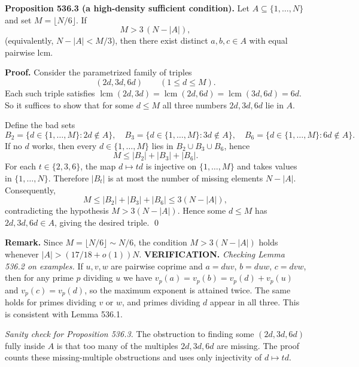 \medskip
\textbf{Proposition 536.3 (a high-density sufficient condition).}
Let $A\subseteq\{1,\dots,N\}$ and set $M=\lfloor N/6\rfloor$.
If
\[
M>3\,(N-|A|),
\]
(equivalently, $N-|A|<M/3$), then there exist distinct $a,b,c\in A$ with equal pairwise lcm.

\textbf{Proof.}
Consider the parametrized family of triples
\[
(2d,3d,6d)\qquad (1\le d\le M).
\]
Each such triple satisfies $\operatorname{lcm}(2d,3d)=\operatorname{lcm}(2d,6d)=\operatorname{lcm}(3d,6d)=6d$.
So it suffices to show that for some $d\le M$ all three numbers $2d,3d,6d$ lie in $A$.

Define the bad sets
\[
B_2=\{d\in\{1,\dots,M\}:2d\notin A\},\quad
B_3=\{d\in\{1,\dots,M\}:3d\notin A\},\quad
B_6=\{d\in\{1,\dots,M\}:6d\notin A\}.
\]
If no $d$ works, then every $d\in\{1,\dots,M\}$ lies in $B_2\cup B_3\cup B_6$, hence
\[
M\le |B_2|+|B_3|+|B_6|.
\]
For each $t\in\{2,3,6\}$, the map $d\mapsto td$ is injective on $\{1,\dots,M\}$ and takes values in $\{1,\dots,N\}$. Therefore $|B_t|$ is at most the number of missing elements $N-|A|$.
Consequently,
\[
M\le |B_2|+|B_3|+|B_6|\le 3(N-|A|),
\]
contradicting the hypothesis $M>3(N-|A|)$.
Hence some $d\le M$ has $2d,3d,6d\in A$, giving the desired triple. \qed

\textbf{Remark.}
Since $M=\lfloor N/6\rfloor\sim N/6$, the condition $M>3(N-|A|)$ holds whenever $|A|>(17/18+o(1))N$.
\noindent\textbf{VERIFICATION.}
\emph{Checking Lemma 536.2 on examples.} If $u,v,w$ are pairwise coprime and $a=d u v$, $b=d u w$, $c=d v w$, then for any prime $p$ dividing $u$ we have $v_p(a)=v_p(b)=v_p(d)+v_p(u)$ and $v_p(c)=v_p(d)$, so the maximum exponent is attained twice. The same holds for primes dividing $v$ or $w$, and primes dividing $d$ appear in all three. This is consistent with Lemma 536.1.

\emph{Sanity check for Proposition 536.3.} The obstruction to finding some $(2d,3d,6d)$ fully inside $A$ is that too many of the multiples $2d,3d,6d$ are missing. The proof counts these missing-multiple obstructions and uses only injectivity of $d\mapsto td$.

